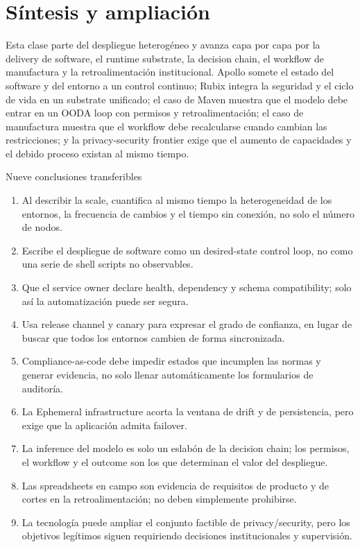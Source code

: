 \section{Síntesis y ampliación}

Esta clase parte del despliegue heterogéneo y avanza capa por capa por la delivery de software, el runtime substrate, la decision chain, el workflow de manufactura y la retroalimentación institucional. Apollo somete el estado del software y del entorno a un control continuo; Rubix integra la seguridad y el ciclo de vida en un substrate unificado; el caso de Maven muestra que el modelo debe entrar en un OODA loop con permisos y retroalimentación; el caso de manufactura muestra que el workflow debe recalcularse cuando cambian las restricciones; y la privacy-security frontier exige que el aumento de capacidades y el debido proceso existan al mismo tiempo.

\begin{importantbox}{Nueve conclusiones transferibles}
\begin{enumerate}
  \item Al describir la scale, cuantifica al mismo tiempo la heterogeneidad de los entornos, la frecuencia de cambios y el tiempo sin conexión, no solo el número de nodos.
  \item Escribe el despliegue de software como un desired-state control loop, no como una serie de shell scripts no observables.
  \item Que el service owner declare health, dependency y schema compatibility; solo así la automatización puede ser segura.
  \item Usa release channel y canary para expresar el grado de confianza, en lugar de buscar que todos los entornos cambien de forma sincronizada.
  \item Compliance-as-code debe impedir estados que incumplen las normas y generar evidencia, no solo llenar automáticamente los formularios de auditoría.
  \item La Ephemeral infrastructure acorta la ventana de drift y de persistencia, pero exige que la aplicación admita failover.
  \item La inference del modelo es solo un eslabón de la decision chain; los permisos, el workflow y el outcome son los que determinan el valor del despliegue.
  \item Las spreadsheets en campo son evidencia de requisitos de producto y de cortes en la retroalimentación; no deben simplemente prohibirse.
  \item La tecnología puede ampliar el conjunto factible de privacy/security, pero los objetivos legítimos siguen requiriendo decisiones institucionales y supervisión.
\end{enumerate}
\end{importantbox}

